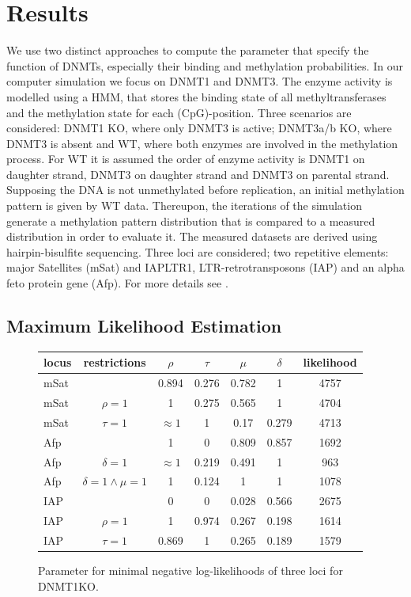 \chapter{Results}
\label{chapter:results}
We use two distinct approaches to compute the parameter that specify the function of \acfp{DNMT}, especially their binding and methylation probabilities. In our computer simulation we focus on DNMT1 and DNMT3. The enzyme activity is modelled using a \acf{HMM}, that stores the binding state of all methyltransferases and the methylation state for each (\acf{CpG})-position. Three scenarios are considered: DNMT1 \acf{KO}, where only DNMT3 is active; DNMT3a/b \ac{KO}, where DNMT3 is absent and \acf{WT}, where both enzymes are involved in the methylation process. For \ac{WT} it is assumed the order of enzyme activity is DNMT1 on daughter strand, DNMT3 on daughter strand and DNMT3 on parental strand. Supposing the DNA is not unmethylated before replication, an initial methylation pattern is given by \ac{WT} data. Thereupon, the iterations of the simulation generate a methylation pattern distribution that is compared to a measured distribution in order to evaluate it.\newline
The measured datasets are derived using hairpin-bisulfite sequencing. Three loci are considered; two repetitive elements: major Satellites (mSat) and IAPLTR1, LTR-retrotransposons (IAP) and an alpha feto protein gene (Afp). For more details see \cite{Wolf}.

\section{Maximum Likelihood Estimation}
\label{MLE}
\begin{figure}[h]
\begin{center}
\begin{tabularx}{\textwidth}{l|c|c|c|c|c|c}
locus&	restrictions&	$\rho$&	$\tau$&	$\mu$&	$\delta$&	likelihood\\
\hline
mSat&	&	0.894&	0.276&	0.782&	1&	4757\\%
mSat&	$\rho=1$&	1&	0.275&	0.565&	1&	4704\\%
mSat&	$\tau=1$&	$\approx1$&	1&	0.17&	0.279&	4713\\
Afp&	&	1&	0&	0.809&	0.857&	1692\\%
Afp&	$\delta=1$&	$\approx1$&	0.219&	0.491&	1&	963\\%
Afp&	$\delta=1 \wedge \mu=1$&	1&	0.124&	1&	1&	1078\\%
IAP&	&	0&	0&	0.028&	0.566&	2675\\
IAP&	$\rho=1$&	1&	0.974&	0.267&	0.198&	1614\\
IAP&	$\tau=1$&	0.869&	1&	0.265&	0.189&	1579\\
\end{tabularx}
\end{center}
\label{DNMT1KO}
\caption{Parameter for minimal negative log-likelihoods of three loci for DNMT1KO.}
\end{figure}

